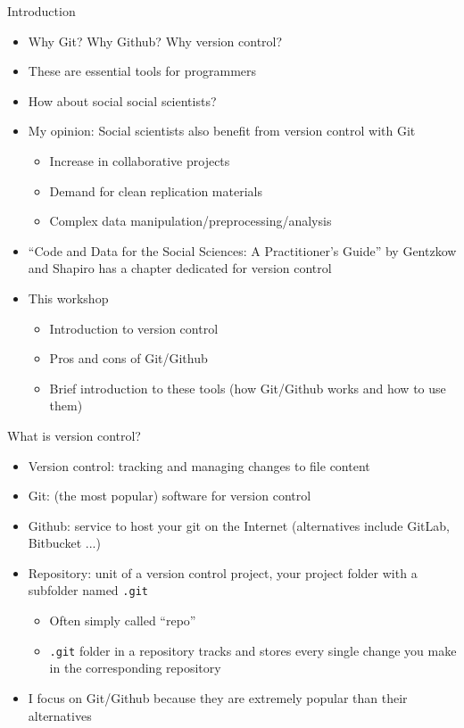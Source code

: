\documentclass[handout,pdftex,10pt,aspectratio=169]{beamer}
\begin{document}
\begin{frame}{Introduction}
  \begin{itemize}[<+->]  \setlength\itemsep{-3pt}
    \item Why Git? Why Github? Why version control?
    \item These are essential tools for programmers
    \item How about social social scientists?
    \item My opinion: Social scientists also benefit from version control with Git \vspace{-5pt}
    \begin{itemize} \setlength\itemsep{-5pt}
      \item Increase in collaborative projects
      \item Demand for clean replication materials
      \item Complex data manipulation/preprocessing/analysis
    \end{itemize}
    \item ``Code and Data for the Social Sciences: A Practitioner's Guide''
    by Gentzkow and Shapiro has a chapter dedicated for version control
    \medskip
    \item This workshop \vspace{-5pt}
    \begin{itemize} \setlength\itemsep{-5pt}
      \item Introduction to version control
      \item Pros and cons of Git/Github
      \item Brief introduction to these tools (how Git/Github works and how to use them)
    \end{itemize}
  \end{itemize}
\end{frame}


\begin{frame}{What is version control?}
  \begin{itemize}[<+->]
    \item Version control: tracking and managing changes to file content
    \item Git: (the most popular) software for version control
    \item Github: service to host your git on the Internet
    (alternatives include GitLab, Bitbucket ...)
    \item Repository: unit of a version control project, 
    your project folder with a subfolder named \texttt{.git}
    \begin{itemize}
      \item Often simply called ``repo''
      \item \texttt{.git} folder in a repository tracks and stores every single change you make in the corresponding repository
    \end{itemize}
    \medskip
    \item I focus on Git/Github  because they are extremely popular
    than their alternatives
  \end{itemize}
\end{frame}
\end{document}

